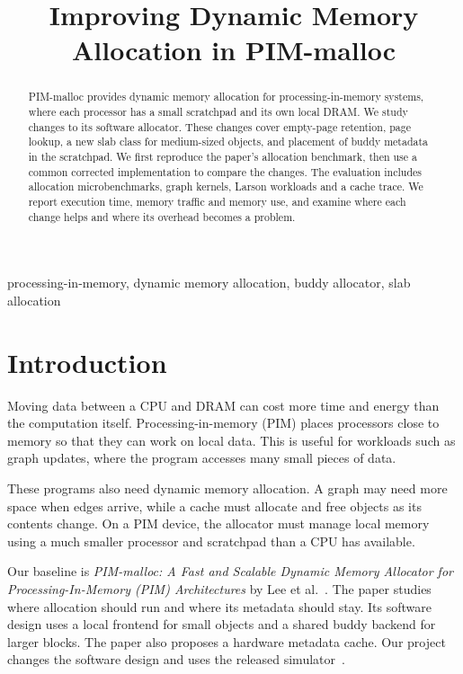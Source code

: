\documentclass[conference]{IEEEtran}
\title{Improving Dynamic Memory Allocation in PIM-malloc}
\author{
\IEEEauthorblockN{\small
Bhavya Negi (\textit{230101025}), Lasya Madhu Sundar (\textit{230101058}),
Pinjala Narmada (\textit{230101074}), Tedla Mahaswin (\textit{230101104})}
\IEEEauthorblockA{\small \textit{Group-11}}
}
\begin{document}
\raggedbottom
\maketitle

\begin{abstract}
PIM-malloc provides dynamic memory allocation for processing-in-memory systems, where each processor has a small scratchpad and its own local DRAM. We study changes to its software allocator. These changes cover empty-page retention, page lookup, a new slab class for medium-sized objects, and placement of buddy metadata in the scratchpad. We first reproduce the paper's allocation benchmark, then use a common corrected implementation to compare the changes. The evaluation includes allocation microbenchmarks, graph kernels, Larson workloads and a cache trace. We report execution time, memory traffic and memory use, and examine where each change helps and where its overhead becomes a problem.
\end{abstract}
\begin{IEEEkeywords}
processing-in-memory, dynamic memory allocation, buddy allocator, slab allocation
\end{IEEEkeywords}

\section{Introduction}
Moving data between a CPU and DRAM can cost more time and energy than the computation itself. Processing-in-memory (PIM) places processors close to memory so that they can work on local data. This is useful for workloads such as graph updates, where the program accesses many small pieces of data.

These programs also need dynamic memory allocation. A graph may need more space when edges arrive, while a cache must allocate and free objects as its contents change. On a PIM device, the allocator must manage local memory using a much smaller processor and scratchpad than a CPU has available.

Our baseline is \emph{PIM-malloc: A Fast and Scalable Dynamic Memory Allocator for Processing-In-Memory (PIM) Architectures} by Lee et al.~\cite{pimmalloc}. The paper studies where allocation should run and where its metadata should stay. Its software design uses a local frontend for small objects and a shared buddy backend for larger blocks. The paper also proposes a hardware metadata cache. Our project changes the software design and uses the released simulator~\cite{artifact}.
\end{document}
